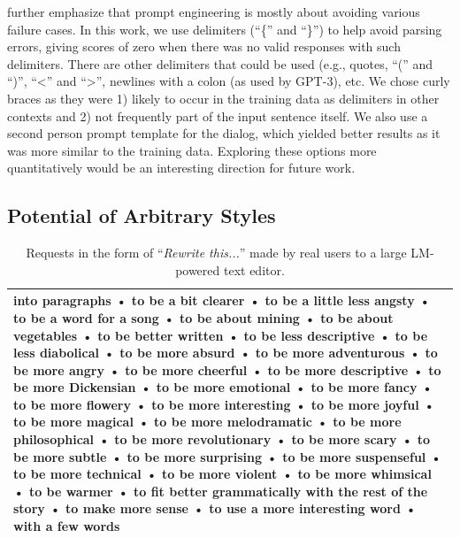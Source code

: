 

\citet{reynolds2021prompt} further emphasize that prompt engineering is mostly about avoiding various failure cases.
 In this work, we use delimiters (``\{'' and ``\}'') to help avoid parsing errors, giving scores of zero when there was no valid responses with such delimiters. There are other delimiters that could be used (e.g., quotes, ``('' and ``)'', ``<'' and ``>'', newlines with a colon (as used by GPT-3), etc. We chose curly braces as they were 1) likely to occur in the training data as delimiters in other contexts and 2) not frequently part of the input sentence itself. We also use a second person prompt template for the dialog, which yielded better results as it was more similar to the training data. Exploring these options more quantitatively would be an interesting direction for future work.


\subsection{Potential of Arbitrary Styles}\label{subsec:potential}
 
\begin{table}[t]
\caption{\label{tab:unique_requests}Requests in the form of ``\textit{Rewrite this...}'' made by real users to a large LM-powered text editor.}
\label{tab:realusers}
\small
\def\arraystretch{1.5}%
\begin{tabular}{p{}}
\hline
into paragraphs • to be a bit clearer • to be a little less angsty • to be a word for a song • to be about mining • to be about vegetables • to be better written • to be less descriptive • to be less diabolical • to be more absurd • to be more adventurous • to be more angry • to be more cheerful • to be more descriptive • to be more Dickensian • to be more emotional • to be more fancy • to be more flowery • to be more interesting • to be more joyful • to be more magical • to be more melodramatic • to be more philosophical • to be more revolutionary • to be more scary • to be more subtle • to be more surprising • to be more suspenseful • to be more technical • to be more violent • to be more whimsical • to be warmer • to fit better grammatically with the rest of the story • to make more sense • to use a more interesting word • with a few words \\
\hline
\end{tabular}
\end{table}

